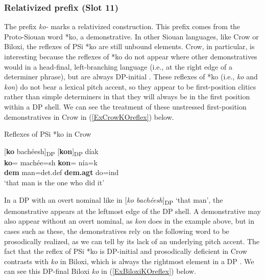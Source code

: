 \subsubsection{Relativized prefix (Slot 11)}\label{SubsubsecRelativized}

The prefix \textit{ko-} marks a relativized construction. This prefix comes from the Proto-Siouan word *ko, a demonstrative. In other Siouan languages, like Crow or Biloxi, the reflexes of PSi *ko are still unbound elements. Crow, in particular, is interesting because the reflexes of *ko do not appear where other demonstratives would in a head-final, left-branching language (i.e., at the right edge of a determiner phrase), but are always DP-initial \citep{graczyk2007}. These reflexes of *ko (i.e., \textit{ko} and \textit{kon}) do not bear a lexical pitch accent, so they appear to be first-position clitics rather than simple determiners in that they will always be in the first position within a DP shell. We can see the treatment of these unstressed first-position demonstratives in Crow in (\ref{ExCrowKOreflex}) below.

\begin{exe}
\item\label{ExCrowKOreflex} Reflexes of PSi *ko in Crow

\glll \textnormal{[}\textbf{ko} bachéesh\textnormal{]\textsubscript{DP}} \textnormal{[}\textbf{kon}\textnormal{]\textsubscript{DP}} díak\\
\textbf{ko}= machée=sh \textbf{kon}= nía=k\\
\textbf{dem} \textnormal{man}=det.def \textbf{dem.agt} \textnormal{do}=ind\\
\glt `that man is the one who did it' \citep[222]{graczyk2007}

\end{exe}

In a DP with an overt nominal like in [\textit{ko bachéesh}]\textsubscript{DP} `that man', the demonstrative appears at the leftmost edge of the DP shell. A demonstrative may also appear without an overt nominal, as \textit{kon} does in the example above, but in cases such as these, the demonstratives rely on the following word to be prosodically realized, as we can tell by its lack of an underlying pitch accent. The fact that the reflex of PSi *ko is DP-initial and prosodically deficient in Crow contrasts with \textit{ko} in Biloxi, which is always the rightmost element in a DP \citep{torres2010}. We can see this DP-final Biloxi \textit{ko} in (\ref{ExBiloxiKOreflex}) below.


